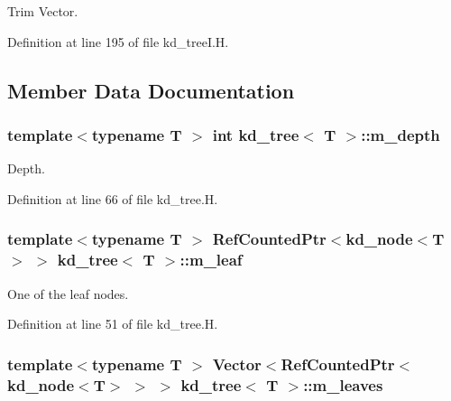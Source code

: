 Trim Vector. 



Definition at line 195 of file kd\+\_\+tree\+I.\+H.



\subsection{Member Data Documentation}
\subsubsection[{\texorpdfstring{m\+\_\+depth}{m_depth}}]{\setlength{\rightskip}{0pt plus 5cm}template$<$typename T $>$ int {\bf kd\+\_\+tree}$<$ T $>$\+::m\+\_\+depth\hspace{0.3cm}{\ttfamily [protected]}}\hypertarget{classkd__tree_a587276a40678198a1f08ce0dfda12ded}{}\label{classkd__tree_a587276a40678198a1f08ce0dfda12ded}


Depth. 



Definition at line 66 of file kd\+\_\+tree.\+H.

\subsubsection[{\texorpdfstring{m\+\_\+leaf}{m_leaf}}]{\setlength{\rightskip}{0pt plus 5cm}template$<$typename T $>$ Ref\+Counted\+Ptr$<${\bf kd\+\_\+node}$<$T$>$ $>$ {\bf kd\+\_\+tree}$<$ T $>$\+::m\+\_\+leaf\hspace{0.3cm}{\ttfamily [protected]}}\hypertarget{classkd__tree_a9c9ee020f19e2bc6e092c720dec17876}{}\label{classkd__tree_a9c9ee020f19e2bc6e092c720dec17876}


One of the leaf nodes. 



Definition at line 51 of file kd\+\_\+tree.\+H.

\subsubsection[{\texorpdfstring{m\+\_\+leaves}{m_leaves}}]{\setlength{\rightskip}{0pt plus 5cm}template$<$typename T $>$ Vector$<$Ref\+Counted\+Ptr$<${\bf kd\+\_\+node}$<$T$>$ $>$ $>$ {\bf kd\+\_\+tree}$<$ T $>$\+::m\+\_\+leaves\hspace{0.3cm}{\ttfamily [protected]}}\hypertarget{classkd__tree_ab0e027509eb1151fc13e3e4d54d21f08}{}\label{classkd__tree_ab0e027509eb1151fc13e3e4d54d21f08}


